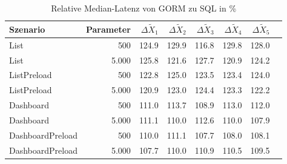 
\begin{table}[ht]
\setlength{\extrarowheight}{-1pt}
\centering
\caption{Relative Median-Latenz von GORM zu SQL in \%}
\begin{tabular}{lrrrrrrr}
\toprule
Szenario & Parameter & ${\Delta \tilde{X}_1}$ & ${\Delta \tilde{X}_2}$ & ${\Delta \tilde{X}_3}$ & ${\Delta \tilde{X}_4}$ & ${\Delta \tilde{X}_5}$ \\
\midrule
	List & 500 & \cellcolor{red!12}  124.9 & \cellcolor{red!15}  129.9 & \cellcolor{red!8}  116.8 & \cellcolor{red!15}  129.8 & \cellcolor{red!14}  128.0 \\
	List & 5.000 & \cellcolor{red!13}  125.8 & \cellcolor{red!11}  121.6 & \cellcolor{red!14}  127.7 & \cellcolor{red!10}  120.9 & \cellcolor{red!12}  124.2 \\
	ListPreload & 500 & \cellcolor{red!11}  122.8 & \cellcolor{red!13}  125.0 & \cellcolor{red!12}  123.5 & \cellcolor{red!12}  123.4 & \cellcolor{red!12}  124.0 \\
	ListPreload & 5.000 & \cellcolor{red!10}  120.9 & \cellcolor{red!11}  123.0 & \cellcolor{red!12}  124.4 & \cellcolor{red!12}  123.3 & \cellcolor{red!11}  122.2 \\
	Dashboard & 500 & \cellcolor{red!5}  111.0 & \cellcolor{red!7}  113.7 & \cellcolor{red!4}  108.9 & \cellcolor{red!7}  113.0 & \cellcolor{red!6}  112.0 \\
	Dashboard & 5.000 & \cellcolor{red!6}  111.1 & \cellcolor{red!5}  110.0 & \cellcolor{red!6}  112.6 & \cellcolor{red!5}  110.0 & \cellcolor{red!4}  107.9 \\
	DashboardPreload & 500 & \cellcolor{red!5}  110.0 & \cellcolor{red!6}  111.1 & \cellcolor{red!4}  107.7 & \cellcolor{red!4}  108.0 & \cellcolor{red!4}  108.1 \\
	DashboardPreload & 5.000 & \cellcolor{red!4}  107.7 & \cellcolor{red!5}  110.0 & \cellcolor{red!5}  110.9 & \cellcolor{red!5}  110.5 & \cellcolor{red!5}  109.5 \\
\bottomrule
\end{tabular}
\label{tab:relative_latenz_gorm}
\end{table}
	
